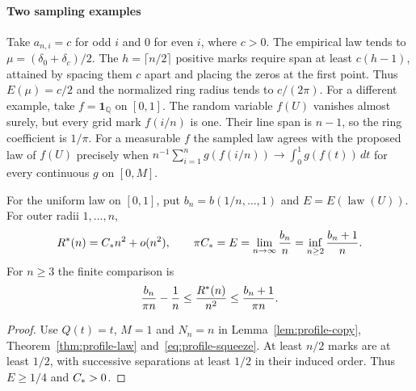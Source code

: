 \paragraph*{Two sampling examples}
Take $a_{n,i}=c$ for odd $i$ and $0$ for even $i$, where $c>0$.
The empirical law tends to $\mu=(\delta_0+\delta_c)/2$. The $h=\lceil n/2\rceil$
positive marks require span at least $c(h-1)$, attained by spacing them
$c$ apart and placing the zeros at the first point. Thus $E(\mu)=c/2$ and
the normalized ring radius tends to $c/(2\pi)$. For a different
example, take $f=\mathbf1_{\mathbb Q}$ on $[0,1]$. The random
variable $f(U)$ vanishes almost surely, but every grid mark $f(i/n)$
is one. Their line span is $n-1$, so the ring coefficient is $1/\pi$.
For a measurable $f$ the sampled law agrees with the proposed law of
$f(U)$ precisely when $n^{-1}\sum_{i=1}^n g(f(i/n))\to\int_0^1g(f(t))\,dt$
for every continuous $g$ on $[0,M]$.

\begin{corollary}\label{thm:existence}
For the uniform law on $[0,1]$, put $b_n=b(1/n,\ldots,1)$ and
$E=E(\operatorname{law}(U))$. For outer radii $1,\ldots,n$,
\begin{equation}\label{eq:limit}
 R^\ast(n)=C_\ast n^2+o(n^2),\qquad
 \pi C_\ast=E=\lim_{n\to\infty}\frac{b_n}{n}=\inf_{n\ge2}\frac{b_n+1}{n}.
\end{equation}
For $n\ge3$ the finite comparison is
\begin{equation}\label{eq:squeeze}
 \frac{b_n}{\pi n}-\frac1n\le\frac{R^\ast(n)}{n^2}\le\frac{b_n+1}{\pi n}.
\end{equation}
\end{corollary}
\begin{proof}
Use $Q(t)=t$, $M=1$ and $N_n=n$ in Lemma~\ref{lem:profile-copy},
Theorem~\ref{thm:profile-law} and~\eqref{eq:profile-squeeze}.
At least $n/2$ marks are at least $1/2$, with successive separations
at least $1/2$ in their induced order. Thus $E\ge1/4$ and $C_\ast>0$.
\end{proof}
